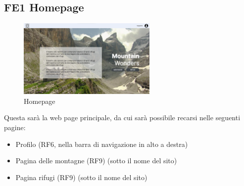 \documentclass[a4paper,12pt]{article}
\begin{document}
\subsection*{FE1 Homepage}
\begin{figure}[ht]
   \centering
    \includegraphics[width=0.6\textwidth]{img/Homepage.png}
    \caption{Homepage}
\end{figure}
Questa sarà la web page principale, da cui sarà possibile recarsi nelle seguenti pagine:
\begin{itemize}
    \item Profilo (RF6, nella barra di navigazione in alto a destra)
    \item Pagina delle montagne (RF9) (sotto il nome del sito)
    \item Pagina rifugi (RF9) (sotto il nome del sito)
\end{itemize}
\end{document}

